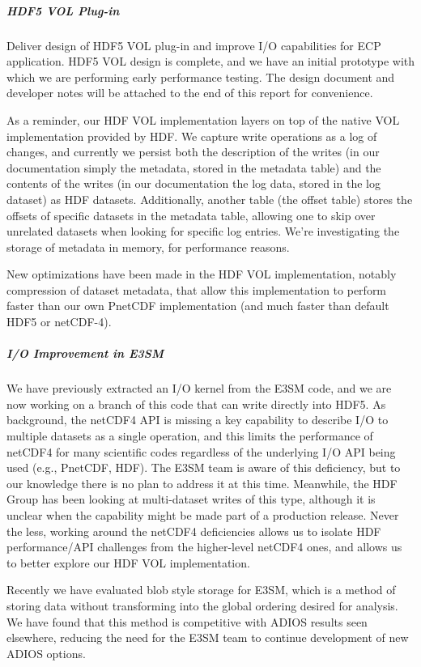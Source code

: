\subparagraph{HDF5 VOL Plug-in} Deliver design of HDF5 VOL plug-in and improve I/O
capabilities for ECP application. HDF5 VOL design is complete, and we have an
initial prototype with which we are performing early performance testing. The
design document and developer notes will be attached to the end of this report
for convenience.

As a reminder, our HDF VOL implementation layers on top of the native VOL
implementation provided by HDF. We capture write operations as a log of
changes, and currently we persist both the description of the writes (in our
documentation simply the metadata, stored in the metadata table) and the
contents of the writes (in our documentation the log data, stored in the log
dataset) as HDF datasets. Additionally, another table (the offset table)
stores the offsets of specific datasets in the metadata table, allowing one to
skip over unrelated datasets when looking for specific log entries. We’re
investigating the storage of metadata in memory, for performance reasons.

New optimizations have been made in the HDF VOL implementation, notably compression
of dataset metadata, that allow this implementation to perform faster than our
own PnetCDF implementation (and much faster than default HDF5 or netCDF-4).

\subparagraph{I/O Improvement in E3SM}
We have previously extracted an I/O kernel from the E3SM code, and
we are now working on a branch of this code that can write directly
into HDF5. As background, the netCDF4 API is missing a key capability
to describe I/O to multiple datasets as a single operation, and
this limits the performance of netCDF4 for many scientific codes
regardless of the underlying I/O API being used (e.g., PnetCDF,
HDF). The E3SM team is aware of this deficiency, but to our knowledge
there is no plan to address it at this time.  Meanwhile, the HDF
Group has been looking at multi-dataset writes of this type, although
it is unclear when the capability might be made part of a production
release. Never the less, working around the netCDF4 deficiencies
allows us to isolate HDF performance/API challenges from the
higher-level netCDF4 ones, and allows us to better explore our HDF
VOL implementation.

Recently we have evaluated blob style storage for E3SM, which
is a method of storing data without transforming into the global
ordering desired for analysis. We have found that this method is
competitive with ADIOS results seen elsewhere, reducing the need
for the E3SM team to continue development of new ADIOS options.

